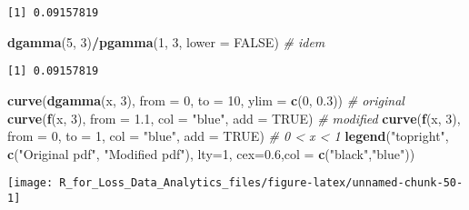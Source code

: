 \documentclass[]{book}
\newenvironment{Shaded}{\begin{snugshade}}{\end{snugshade}}
\newcommand{\KeywordTok}[1]{\textcolor[rgb]{0.13,0.29,0.53}{\textbf{#1}}}
\newcommand{\DataTypeTok}[1]{\textcolor[rgb]{0.13,0.29,0.53}{#1}}
\newcommand{\DecValTok}[1]{\textcolor[rgb]{0.00,0.00,0.81}{#1}}
\newcommand{\FloatTok}[1]{\textcolor[rgb]{0.00,0.00,0.81}{#1}}
\newcommand{\StringTok}[1]{\textcolor[rgb]{0.31,0.60,0.02}{#1}}
\newcommand{\CommentTok}[1]{\textcolor[rgb]{0.56,0.35,0.01}{\textit{#1}}}
\newcommand{\OtherTok}[1]{\textcolor[rgb]{0.56,0.35,0.01}{#1}}
\newcommand{\OperatorTok}[1]{\textcolor[rgb]{0.81,0.36,0.00}{\textbf{#1}}}
\newcommand{\NormalTok}[1]{#1}
\theoremstyle{definition}
\theoremstyle{definition}
\theoremstyle{definition}
\theoremstyle{remark}
\begin{document}
\begin{verbatim}
[1] 0.09157819
\end{verbatim}

\begin{Shaded}
\begin{Highlighting}[]
\KeywordTok{dgamma}\NormalTok{(}\DecValTok{5}\NormalTok{, }\DecValTok{3}\NormalTok{)}\OperatorTok{/}\KeywordTok{pgamma}\NormalTok{(}\DecValTok{1}\NormalTok{, }\DecValTok{3}\NormalTok{, }\DataTypeTok{lower =} \OtherTok{FALSE}\NormalTok{) }\CommentTok{# idem}
\end{Highlighting}
\end{Shaded}

\begin{verbatim}
[1] 0.09157819
\end{verbatim}

\begin{Shaded}
\begin{Highlighting}[]
\KeywordTok{curve}\NormalTok{(}\KeywordTok{dgamma}\NormalTok{(x, }\DecValTok{3}\NormalTok{), }\DataTypeTok{from =} \DecValTok{0}\NormalTok{, }\DataTypeTok{to =} \DecValTok{10}\NormalTok{, }\DataTypeTok{ylim =} \KeywordTok{c}\NormalTok{(}\DecValTok{0}\NormalTok{, }\FloatTok{0.3}\NormalTok{))    }\CommentTok{# original}
\KeywordTok{curve}\NormalTok{(}\KeywordTok{f}\NormalTok{(x, }\DecValTok{3}\NormalTok{), }\DataTypeTok{from =} \FloatTok{1.1}\NormalTok{, }\DataTypeTok{col =} \StringTok{"blue"}\NormalTok{, }\DataTypeTok{add =} \OtherTok{TRUE}\NormalTok{)        }\CommentTok{# modified}
\KeywordTok{curve}\NormalTok{(}\KeywordTok{f}\NormalTok{(x, }\DecValTok{3}\NormalTok{), }\DataTypeTok{from =} \DecValTok{0}\NormalTok{, }\DataTypeTok{to =} \DecValTok{1}\NormalTok{, }\DataTypeTok{col =} \StringTok{"blue"}\NormalTok{, }\DataTypeTok{add =} \OtherTok{TRUE}\NormalTok{)  }\CommentTok{# 0 < x < 1}
\KeywordTok{legend}\NormalTok{(}\StringTok{"topright"}\NormalTok{, }\KeywordTok{c}\NormalTok{(}\StringTok{"Original pdf"}\NormalTok{, }\StringTok{"Modified pdf"}\NormalTok{), }\DataTypeTok{lty=}\DecValTok{1}\NormalTok{, }\DataTypeTok{cex=}\FloatTok{0.6}\NormalTok{,}\DataTypeTok{col =} \KeywordTok{c}\NormalTok{(}\StringTok{"black"}\NormalTok{,}\StringTok{"blue"}\NormalTok{))}
\end{Highlighting}
\end{Shaded}

\begin{center}\texttt{[image: R\_for\_Loss\_Data\_Analytics\_files/figure-latex/unnamed-chunk-50-1]} \end{center}
\end{document}
